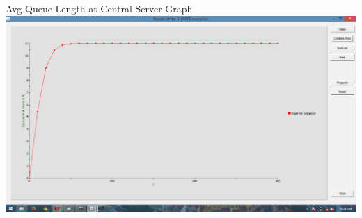 \documentclass[a4paper,12pt]{report}
\begin{document}
\begin{center}
Avg Queue Length at Central Server Graph
 \includegraphics[width=15 cm,height=13 cm]{./queue.png}
\end{center}
\end{document}
